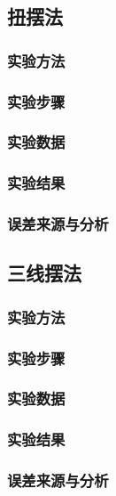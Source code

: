 \documentclass[12pt,hyperref,a4paper,UTF8]{ctexart}
\begin{document}
\subsection{扭摆法}
\subsubsection{实验方法}

\subsubsection{实验步骤}

\subsubsection{实验数据}

\subsubsection{实验结果}

\subsubsection{误差来源与分析}

\subsection{三线摆法}
\subsubsection{实验方法}

\subsubsection{实验步骤}

\subsubsection{实验数据}

\subsubsection{实验结果}

\subsubsection{误差来源与分析}
\end{document}
